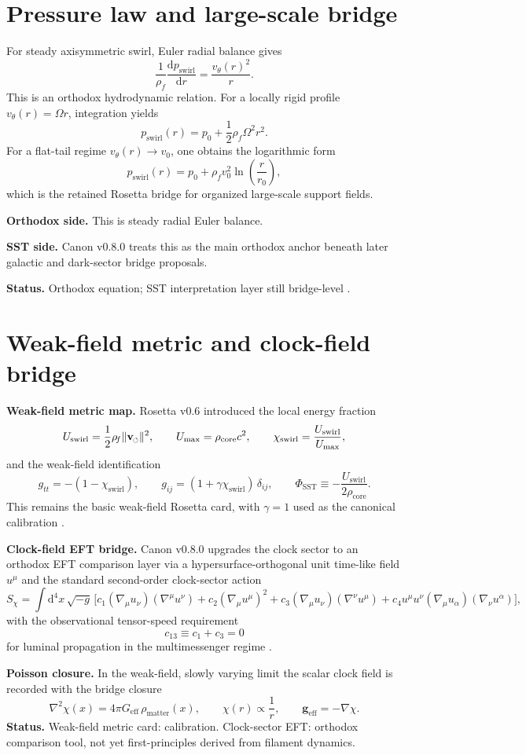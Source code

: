 \documentclass[11pt,a4paper]{article}
\newcommand{\swirlarrow}{%
  \mathchoice{\mkern-2mu\scriptstyle\boldsymbol{\circlearrowleft}}%
  {\mkern-2mu\scriptstyle\boldsymbol{\circlearrowleft}}%
  {\mkern-2mu\scriptscriptstyle\boldsymbol{\circlearrowleft}}%
  {\mkern-2mu\scriptscriptstyle\boldsymbol{\circlearrowleft}}%
}
\newcommand{\vswirl}{\mathbf{v}_{\swirlarrow}}
\newcommand{\rhoF}{\rho_{\!f}}
\newcommand{\rhocore}{\rho_{\mathrm{core}}}
\newcommand{\vnorm}{\lVert \vswirl \rVert}
\newcommand{\Umax}{U_{\max}}
\newcommand{\Uloc}{U_{\mathrm{swirl}}}
\newcommand{\chiswirl}{\chi_{\mathrm{swirl}}}
\newcommand{\dd}{\mathrm d}
\newcommand{\RosettaCard}[1]{\begin{tcolorbox}[colback=blue!4,colframe=blue!60!black,boxrule=0.6pt,arc=3pt,title={#1}]}
\newcommand{\EndRosettaCard}{\end{tcolorbox}}
\begin{document}
\section{Pressure law and large-scale bridge}
\RosettaCard{Rosetta Card 4: Euler radial balance and organized large-scale support}
For steady axisymmetric swirl, Euler radial balance gives
\[
\frac{1}{\rhoF}\frac{\dd p_{\mathrm{swirl}}}{\dd r}=\frac{v_\theta(r)^2}{r}.
\]
This is an orthodox hydrodynamic relation. For a locally rigid profile \(v_\theta(r)=\Omega r\), integration yields
\[
 p_{\mathrm{swirl}}(r)=p_0+\frac12\rhoF\Omega^2 r^2.
\]
For a flat-tail regime \(v_\theta(r)\to v_0\), one obtains the logarithmic form
\[
 p_{\mathrm{swirl}}(r)=p_0+\rhoF v_0^2\ln\!\left(\frac{r}{r_0}\right),
\]
which is the retained Rosetta bridge for organized large-scale support fields.\par
\medskip
\textbf{Orthodox side.} This is steady radial Euler balance.\par
\textbf{SST side.} Canon v0.8.0 treats this as the main orthodox anchor beneath later galactic and dark-sector bridge proposals.\par
\medskip
\textbf{Status.} Orthodox equation; SST interpretation layer still bridge-level \cite{SSTCanon08}.
\EndRosettaCard

\section{Weak-field metric and clock-field bridge}
\RosettaCard{Rosetta Card 5: analogue metric, Poisson bridge, and clock-sector EFT}
\textbf{Weak-field metric map.} Rosetta v0.6 introduced the local energy fraction
\[
\Uloc = \frac12\rhoF\vnorm^2,
\qquad
\Umax = \rhocore c^2,
\qquad
\chiswirl = \frac{\Uloc}{\Umax},
\]
and the weak-field identification
\[
 g_{tt}=-(1-\chiswirl),
 \qquad
 g_{ij}=(1+\gamma\chiswirl)\,\delta_{ij},
\qquad
 \Phi_{\mathrm{SST}}\equiv -\frac{\Uloc}{2\rhocore}.
\]
This remains the basic weak-field Rosetta card, with \(\gamma=1\) used as the canonical calibration \cite{Rosetta06}.\par
\medskip
\textbf{Clock-field EFT bridge.} Canon v0.8.0 upgrades the clock sector to an orthodox EFT comparison layer via a hypersurface-orthogonal unit time-like field \(u^\mu\) and the standard second-order clock-sector action
\[
S_\chi = \int \dd^4x\,\sqrt{-g}\,\bigl[c_1(\nabla_\mu u_\nu)(\nabla^\mu u^\nu)+c_2(\nabla_\mu u^\mu)^2+c_3(\nabla_\mu u_\nu)(\nabla^\nu u^\mu)+c_4 u^\mu u^\nu(\nabla_\mu u_\alpha)(\nabla_\nu u^\alpha)\bigr],
\]
with the observational tensor-speed requirement
\[
 c_{13}\equiv c_1+c_3 = 0
\]
for luminal propagation in the multimessenger regime \cite{SSTCanon08, Jacobson2001, Blas2011, GW170817, Baker2017}.\par
\medskip
\textbf{Poisson closure.} In the weak-field, slowly varying limit the scalar clock field is recorded with the bridge closure
\[
\nabla^2\chi(x)=4\pi G_{\mathrm{eff}}\,\rho_{\mathrm{matter}}(x),
\qquad
\chi(r)\propto \frac{1}{r},
\qquad
\mathbf g_{\mathrm{eff}}=-\nabla\chi.
\]
\textbf{Status.} Weak-field metric card: calibration. Clock-sector EFT: orthodox comparison tool, not yet first-principles derived from filament dynamics.
\EndRosettaCard
\end{document}
